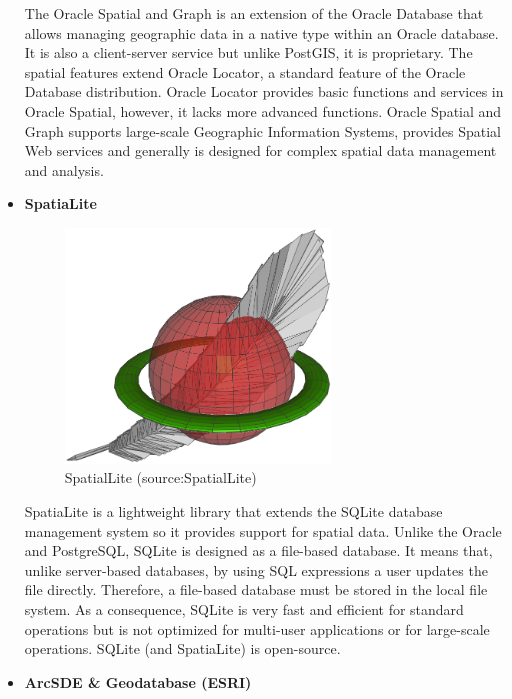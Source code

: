 \begin{itemize}
  
The Oracle Spatial and Graph is an extension of the Oracle Database that allows managing geographic data in a native type within an Oracle database. It is also a client-server service but unlike PostGIS, it is proprietary. The spatial features extend Oracle Locator, a standard feature of the Oracle Database distribution. Oracle Locator provides basic functions and services in Oracle Spatial, however, it lacks more advanced functions. Oracle Spatial and Graph supports large-scale Geographic Information Systems, provides Spatial Web services and generally is designed for complex spatial data management and analysis.

	
\item \textbf{SpatiaLite}

\begin{figure}[H] \centering
      \includegraphics[width=200pt]{./pictures/spatialite.png}
      \caption[SpatialLite logo]{SpatialLite (source:SpatialLite)}
      \label{fig:SpatialLite}
  \end{figure}
  
SpatiaLite is a lightweight library that extends the SQLite database management system so it provides support for spatial data. Unlike the Oracle and PostgreSQL, SQLite is designed as a file-based database. It means that, unlike server-based databases, by using SQL expressions a user updates the file directly. Therefore, a file-based database must be stored in the local file system. As a consequence, SQLite is very fast and efficient for standard operations but is not optimized for multi-user applications or for large-scale operations. SQLite (and SpatiaLite) is open-source.

\item \textbf{ArcSDE \& Geodatabase (ESRI)}


\end{itemize}
